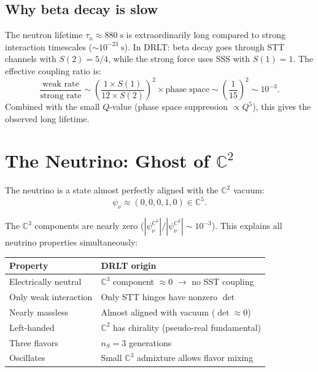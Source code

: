 \documentclass[12pt]{article}
\theoremstyle{remark}
\begin{document}
\subsection{Why beta decay is slow}

The neutron lifetime $\tau_n \approx 880\;\text{s}$ is extraordinarily long compared to strong interaction timescales ($\sim 10^{-23}\;\text{s}$). In DRLT: beta decay goes through STT channels with $S(2) = 5/4$, while the strong force uses SSS with $S(1) = 1$. The effective coupling ratio is:
\begin{equation}
\frac{\text{weak rate}}{\text{strong rate}} \sim \left(\frac{1 \times S(1)}{12 \times S(2)}\right)^2 \times \text{phase space} \sim \left(\frac{1}{15}\right)^2 \sim 10^{-3}.
\end{equation}
Combined with the small $Q$-value (phase space suppression $\propto Q^5$), this gives the observed long lifetime.

\section{The Neutrino: Ghost of $\mathbb{C}^2$}

The neutrino is a state almost perfectly aligned with the $\mathbb{C}^2$ vacuum:
\begin{equation}
\psi_\nu \approx (0, 0, 0, 1, 0) \in \mathbb{C}^5.
\end{equation}

The $\mathbb{C}^3$ components are nearly zero ($|\psi_\nu^{C^3}|/|\psi_\nu^{C^2}| \sim 10^{-3}$). This explains all neutrino properties simultaneously:

\begin{center}
\begin{tabular}{ll}
\hline
Property & DRLT origin \\
\hline
Electrically neutral & $\mathbb{C}^3$ component $\approx 0$ $\to$ no SST coupling \\
Only weak interaction & Only STT hinges have nonzero $\det$ \\
Nearly massless & Almost aligned with vacuum ($\det \approx 0$) \\
Left-handed & $\mathbb{C}^2$ has chirality (pseudo-real fundamental) \\
Three flavors & $n_S = 3$ generations \\
Oscillates & Small $\mathbb{C}^3$ admixture allows flavor mixing \\
\hline
\end{tabular}
\end{center}
\end{document}
